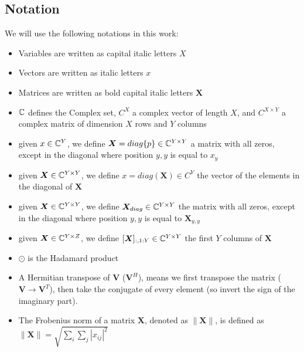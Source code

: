 \subsection{Notation}

We will use the following notations in this work:


\begin{itemize}
  \item Variables are written as capital italic letters $X$
  \item Vectors are written as italic letters $x$
  \item Matrices are written as bold capital italic letters $\bm{X}$
  \item $\mathbb{C}$ defines the Complex set, $C^X$ a complex vector of length $X$, and $C^{X \times Y}$ a complex matrix of dimension $X$ rows and $Y$ columns
  \item given $x \in \mathbb{C}^Y$, we define $\bm{X} = diag\{p\} \in \mathbb{C}^{Y \times Y}$ a matrix with all zeros, except in the diagonal where position $y,y$ is equal to $x_y$
  \item given $\bm{X} \in \mathbb{C}^{Y \times Y}$, we define $x = diag(\bm{X}) \in C^Y$ the vector of the elements in the diagonal of $\bm{X}$
  \item given $\bm{X} \in \mathbb{C}^{Y \times Y}$, we define $\bm{X}_{diag} \in \mathbb{C}^{Y \times Y}$ the matrix with all zeros, except in the diagonal where position $y,y$ is equal to $\bm{X}_{y,y}$
  \item given $\bm{X} \in \mathbb{C}^{Y \times Z}$, we define $[\bm{X}]_{:,1:Y} \in \mathbb{C}^{Y \times Y}$ the first $Y$ columns of $\bm{X}$
  \item $\odot$ is the Hadamard product
  \item A Hermitian transpose of $\bm{V}$ ($\bm{V}^H$), means we first transpose the matrix ($\bm{V} \rightarrow \bm{V}^T$), then take the conjugate of every element (so invert the sign of the imaginary part).
  \item The Frobenius norm of a matrix $\bm{X}$, denoted as $\|\bm{X}\|$, is defined as $\|\bm{X}\| = \sqrt{\sum_{i}\sum_{j} |x_{ij}|^2}$
\end{itemize}

